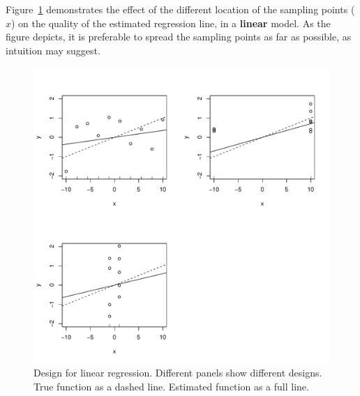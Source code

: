 \begin{example}
\label{eg:design_linear}
Figure~\ref{fig:design_linear} demonstrates the effect of the different location of the sampling points ($x$) on the quality of the estimated regression line, in a \textbf{linear} model.
As the figure depicts, it is preferable to spread the sampling points as far as possible, as intuition may suggest.
\begin{figure}[ht]
\centering
\includegraphics[height=0.3\textheight]{art/linear}
\caption[Design for Linear Models]{Design for linear regression. Different panels show different designs. True function as a dashed line. Estimated function as a full line.}
\label{fig:design_linear}
\end{figure}
\end{example}





